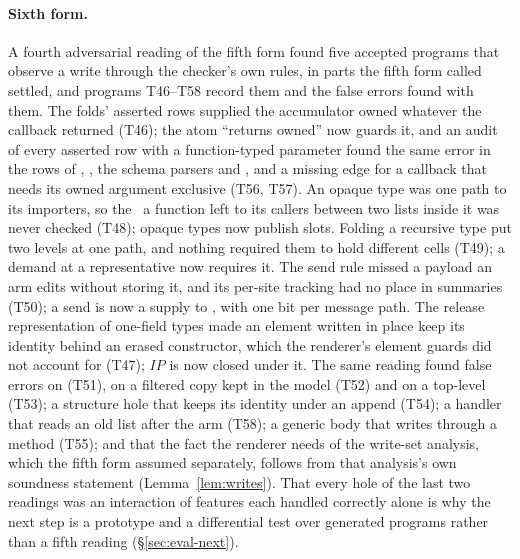 \paragraph{Sixth form.} A fourth adversarial reading of the fifth form found five accepted programs that
observe a write through the checker's own rules, in parts the fifth form called settled, and programs
T46--T58 record them and the false errors found with them. The folds' asserted rows supplied the
accumulator owned whatever the callback returned (T46); the atom ``returns owned'' now guards it, and an
audit of every asserted row with a function-typed parameter found the same error in the rows of
, , the schema parsers and , and a missing edge for a
callback that needs its owned argument exclusive (T56, T57). An opaque type was one path to its importers,
so the \Disjoint\ a function left to its callers between two lists inside it was never checked (T48); opaque
types now publish slots. Folding a recursive type put two levels at one path, and nothing required them to
hold different cells (T49); a demand at a representative now requires it. The send rule missed a payload
an arm edits without storing it, and its per-site tracking had no place in summaries (T50); a send is now a
supply to , with one bit per message path. The release representation of one-field types
made an element written in place keep its identity behind an erased constructor, which the renderer's
element guards did not account for (T47); $\mathit{IP}$ is now closed under it. The same reading found false
errors on  (T51), on a filtered copy kept in the model (T52) and on a top-level
 (T53); a structure hole that keeps its identity under an append (T54); a handler that
reads an old list after the arm (T58); a generic body that writes through a  method (T55); and
that the fact the renderer needs of the write-set analysis, which the fifth form assumed separately, follows
from that analysis's own soundness statement (Lemma~\ref{lem:writes}). That every hole of the last two
readings was an interaction of features each handled correctly alone is why the next step is a prototype
and a differential test over generated programs rather than a fifth reading (\S\ref{sec:eval-next}).

